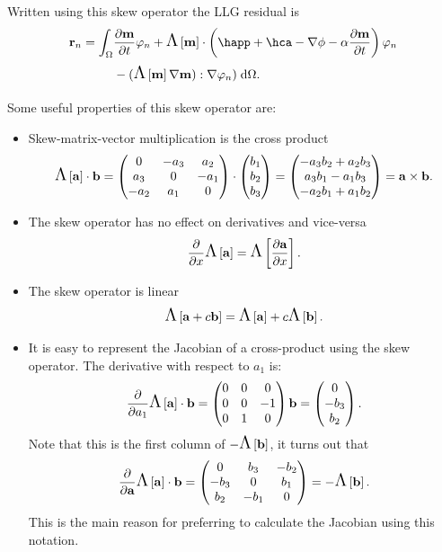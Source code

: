 Written using this skew operator the LLG residual is
\begin{equation}
  \begin{aligned}
    \rllgv_n = \int_{\magd}
    & \dmdt \tbf_n + \skewm{\mv} \cdot \left( \happ + \hca - \nabla \phi - \dampc \dmdt
    \right) \tbf_n \\
    &- (\skewm{\mv} \grad \mv) : \grad \tbf_n)
    \d\magd.
  \end{aligned}
\end{equation} 

Some useful properties of this skew operator are:
\begin{itemize}
\item Skew-matrix-vector multiplication is the cross product
  \begin{equation}
    \text{\Large{$\Lambda$}}\left[ {\mathbf{a}} \right] \cdot {\mathbf{b}}
    = \begin{pmatrix}
      0 & -a_3 & a_2 \\
      a_3 & 0 & -a_1 \\
      -a_2 & a_1 & 0
    \end{pmatrix}
    \cdot \begin{pmatrix} b_1 \\ b_2 \\ b_3 \end{pmatrix}
    = \begin{pmatrix} -a_3b_2 + a_2b_3 \\ a_3b_1 - a_1b_3 \\ -a_2b_1 + a_1b_2 \end{pmatrix}
    = {\mathbf{a}} \times {\mathbf{b}}.
  \end{equation}

\item The skew operator has no effect on derivatives and vice-versa
  \begin{equation}
    \frac{\partial }{\partial x} \text{\Large{$\Lambda$}}\left[ {\mathbf{a}} \right] = \text{\Large{$\Lambda$}}\left[  \frac{\partial {\mathbf{a}}}{\partial x}  \right].
  \end{equation}

\item The skew operator is linear
  \begin{equation}
    \text{\Large{$\Lambda$}}\left[ {\mathbf{a}} + c {\mathbf{b}} \right] = \text{\Large{$\Lambda$}}\left[ {\mathbf{a}} \right] + c \text{\Large{$\Lambda$}}\left[ {\mathbf{b}} \right].
  \end{equation}

\item It is easy to represent the Jacobian of a cross-product using the skew operator.
  The derivative with respect to $a_1$ is: 
  \begin{equation}
    \frac{\partial }{\partial a_1} \text{\Large{$\Lambda$}}\left[ {\mathbf{a}} \right] \cdot {\mathbf{b}} = \begin{pmatrix}
      0 & 0 & 0 \\
      0 & 0 & -1 \\
      0 & 1 & 0
    \end{pmatrix}{\mathbf{b}} = \begin{pmatrix} 0 \\ -b_3 \\ b_2 \end{pmatrix}.
  \end{equation}
  Note that this is the first column of $-\text{\Large{$\Lambda$}}\left[ {\mathbf{b}} \right]$, it turns out that
  \begin{equation}
    \frac{\partial }{\partial {\mathbf{a}}} \text{\Large{$\Lambda$}}\left[ {\mathbf{a}} \right] \cdot {\mathbf{b}} = \begin{pmatrix}
      0 & b_3 & -b_2 \\
      -b_3 & 0 & b_1 \\
      b_2 & -b_1 & 0
    \end{pmatrix} = -\text{\Large{$\Lambda$}}\left[ {\mathbf{b}} \right].
    \label{eq:61}
  \end{equation}
  This is the main reason for preferring to calculate the Jacobian using this notation.
\end{itemize}

